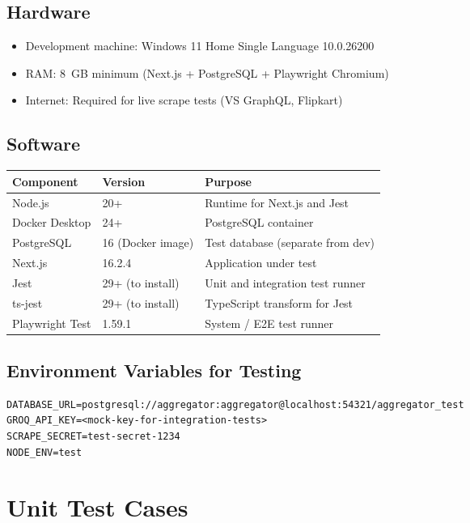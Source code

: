 \documentclass[12pt,a4paper]{report}
\begin{document}
\section{Hardware}
\begin{itemize}[noitemsep]
  \item Development machine: Windows 11 Home Single Language 10.0.26200
  \item RAM: 8~GB minimum (Next.js + PostgreSQL + Playwright Chromium)
  \item Internet: Required for live scrape tests (VS GraphQL, Flipkart)
\end{itemize}

\section{Software}
\begin{longtable}{L{4cm} L{4cm} L{5cm}}
  \toprule
  \textbf{Component} & \textbf{Version} & \textbf{Purpose} \\
  \midrule
  \endhead
  Node.js & 20+ & Runtime for Next.js and Jest \\
  Docker Desktop & 24+ & PostgreSQL container \\
  PostgreSQL & 16 (Docker image) & Test database (separate from dev) \\
  Next.js & 16.2.4 & Application under test \\
  Jest & 29+ (to install) & Unit and integration test runner \\
  ts-jest & 29+ (to install) & TypeScript transform for Jest \\
  Playwright Test & 1.59.1 & System / E2E test runner \\
  \bottomrule
\end{longtable}

\section{Environment Variables for Testing}
\begin{verbatim}
DATABASE_URL=postgresql://aggregator:aggregator@localhost:54321/aggregator_test
GROQ_API_KEY=<mock-key-for-integration-tests>
SCRAPE_SECRET=test-secret-1234
NODE_ENV=test
\end{verbatim}

\chapter{Unit Test Cases}
\end{document}
